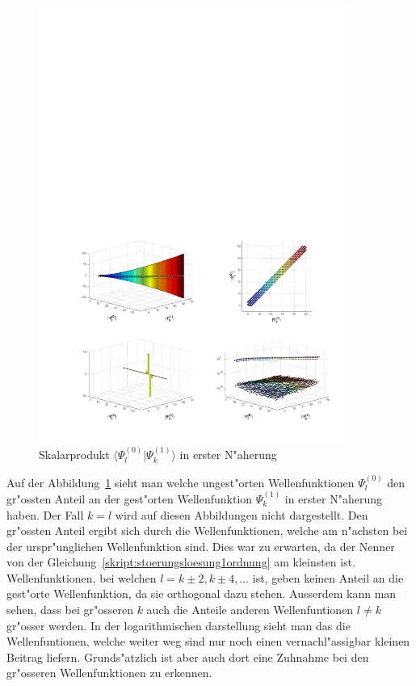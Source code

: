 \begin{refsection}
\begin{figure}[h]	%
\centering
\includegraphics[width=0.9\textwidth]{anharmonisch/images/x3/Stoerung1Skalare.pdf}
\caption{Skalarprodukt $\langle\Psi_l^{(0)}|\Psi_k^{(1)}\rangle$ in erster N"aherung
\label{skript:x3_Stoerung1Skalare}}
\end{figure}

Auf der Abbildung~\ref{skript:x3_Stoerung1Skalare} sieht man welche ungest"orten Wellenfunktionen $\Psi_l^{(0)}$ den gr"ossten Anteil an der gest"orten Wellenfunktion $\Psi_k^{(1)}$ in erster N"aherung haben. Der Fall $k=l$ wird auf diesen Abbildungen nicht dargestellt. Den gr"ossten Anteil ergibt sich durch die Wellenfunktionen, welche am n"achsten bei der urspr"unglichen Wellenfunktion sind. Dies war zu erwarten, da der Nenner von der Gleichung~\ref{skript:stoerungsloesung1ordnung} am kleinsten ist. Wellenfunktionen, bei welchen $l=k\pm 2,k\pm 4,\dots$ ist, geben keinen Anteil an die gest"orte Wellenfunktion, da sie orthogonal dazu stehen. Ausserdem kann man sehen, dass bei gr"osseren $k$ auch die Anteile anderen Wellenfuntionen $l\neq k$ gr"osser werden. In der logarithmischen darstellung sieht man das die Wellenfuntionen, welche weiter weg sind nur noch einen vernachl"assigbar kleinen Beitrag liefern. Grunds"atzlich ist aber auch dort eine Zuhnahme bei den gr"osseren Wellenfunktionen zu erkennen.



\end{refsection}
